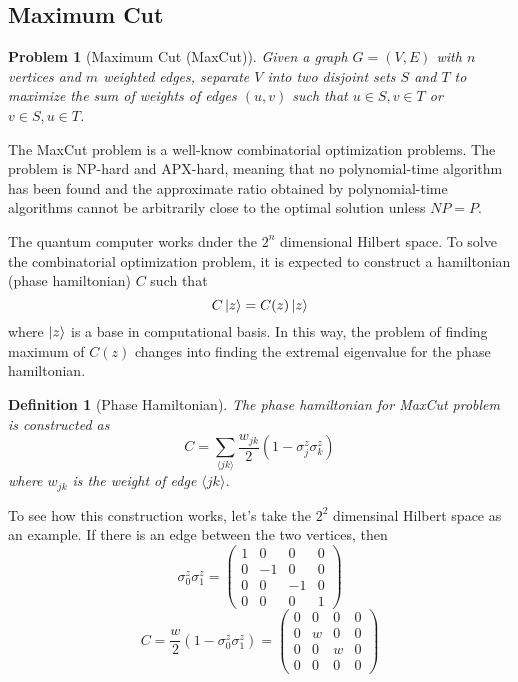 \documentclass{./source/Report}
\newtheorem{problem}{Problem}
\newtheorem{definition}{Definition}
\begin{document}
\subsection{Maximum Cut}

\begin{problem}[Maximum Cut (MaxCut)]
Given a graph $G =(V, E)$ with $n$ vertices and $m$ weighted edges, separate 
$V$ into two disjoint sets $S$ and $T$ to maximize the sum of weights of edges $(u, v)$ 
such that $u\in S, v\in T$ or $v\in S, u\in T$.
\end{problem}

The MaxCut problem is a well-know combinatorial optimization 
problems. The problem is NP-hard and APX-hard, meaning that no polynomial-time 
algorithm has been found and the approximate ratio obtained by polynomial-time algorithms
cannot be arbitrarily close to the optimal solution unless $NP=P$. 

The quantum computer works dnder the $2^n$ dimensional Hilbert space. To solve the combinatorial optimization problem, 
it is expected to construct a hamiltonian (phase hamiltonian) $C$ such that
\begin{equation}
    C\ket{z}=C(z)\ket{z}
    \label{eq:parallelism}
\end{equation}
where $\ket{z}$ is a base in computational basis. In this way, the problem of finding maximum of $C(z)$ changes into finding the 
extremal eigenvalue for the phase hamiltonian.

\begin{definition}[Phase Hamiltonian]
The phase hamiltonian for MaxCut problem is constructed as
\begin{equation}
    C=\sum_{\langle jk\rangle}\frac{w_{jk}}{2}(1-\sigma_j^z\sigma_k^z)
\end{equation}
where $w_{jk}$ is the weight of edge $\langle jk \rangle$.
\end{definition}
To see how this construction works, let's take the $2^2$ dimensinal Hilbert space as an example.
If there is an edge between the two vertices, then 
\begin{equation}
    \sigma_0^z\sigma_1^z = 
    \left( \begin{matrix}
        1 & 0 & 0 & 0 \\ 0 & -1 & 0 & 0 \\ 0 & 0 & -1 & 0 \\ 0 & 0 & 0 & 1
    \end{matrix} \right)
\end{equation}
\begin{equation}
    C = \frac{w}{2}(1-\sigma_0^z\sigma_1^z)=
    \left( \begin{matrix}
        0 & 0 & 0 & 0 \\ 0 & w & 0 & 0 \\ 0 & 0 & w & 0 \\ 0 & 0 & 0 & 0
    \end{matrix} \right)
\end{equation}
\end{document}

